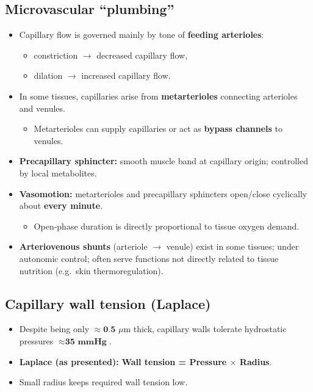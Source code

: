 \documentclass[11pt,a4paper]{article}
\begin{document}
\subsection{Microvascular ``plumbing''}
\begin{itemize}
\item Capillary flow is governed mainly by tone of \textbf{feeding arterioles}:
  \begin{itemize}
  \item constriction $\rightarrow$ decreased capillary flow,
  \item dilation $\rightarrow$ increased capillary flow.
  \end{itemize}
\item In some tissues, capillaries arise from \textbf{metarterioles} connecting arterioles and venules.
  \begin{itemize}
  \item Metarterioles can supply capillaries or act as \textbf{bypass channels} to venules.
  \end{itemize}
\item \textbf{Precapillary sphincter:} smooth muscle band at capillary origin; controlled by local metabolites.
\item \textbf{Vasomotion:} metarterioles and precapillary sphincters open/close cyclically about \textbf{every minute}.
  \begin{itemize}
  \item Open-phase duration is directly proportional to tissue oxygen demand.
  \end{itemize}
\item \textbf{Arteriovenous shunts} (arteriole $\rightarrow$ venule) exist in some tissues; under autonomic control; often serve functions not directly related to tissue nutrition (e.g.\ skin thermoregulation).
\end{itemize}

\subsection{Capillary wall tension (Laplace)}
\begin{itemize}
\item Despite being only $\approx \textbf{0.5 }\mu\mathrm{m}$ thick, capillary walls tolerate hydrostatic pressures $\approx \textbf{35 mmHg}$.
\item \textbf{Laplace (as presented):} \textbf{Wall tension = Pressure $\times$ Radius}.
\item Small radius keeps required wall tension low.
\end{itemize}
\end{document}
